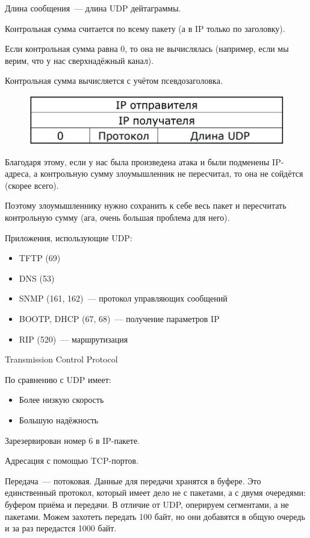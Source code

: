 Длина сообщения~--- длина UDP дейтаграммы.

Контрольная сумма считается по всему пакету (а в IP только по заголовку).

Если контрольная сумма равна 0, то она не вычислялась (например, если мы верим, что у нас сверхнадёжный канал).

Контрольная сумма вычисляется с учётом псевдозаголовка.

\begin{figure}[H]
  \centering
  \includegraphics[width=15cm]{images/03/02}
\end{figure}

Благодаря этому, если у нас была произведена атака и были подменены IP-адреса, а контрольную сумму злоумышленник не пересчитал, то она не сойдётся (скорее всего).

Поэтому злоумышленнику нужно сохранить к себе весь пакет и пересчитать контрольную сумму (ага, очень большая проблема для него).

Приложения, использующие UDP:
\begin{itemize}
    \item TFTP (69)
    \item DNS (53)
    \item SNMP (161, 162)~--- протокол управляющих сообщений
    \item BOOTP, DHCP (67, 68)~--- получение параметров IP
    \item RIP (520)~--- маршрутизация
\end{itemize}


Transmission Control Protocol

По сравнению с UDP имеет:
\begin{itemize}
    \item Более низкую скорость
    \item Большую надёжность
\end{itemize}

Зарезервирован номер 6 в IP-пакете.

Адресация с помощью TCP-портов.

Передача~--- потоковая. Данные для передачи хранятся в буфере. Это единственный протокол, который имеет дело не с пакетами, а с двумя очередями: буфером приёма и передачи. В отличие от UDP, оперируем сегментами, а не пакетами. Можем захотеть передать 100 байт, но они добавятся в общую очередь и за раз передастся 1000 байт.

